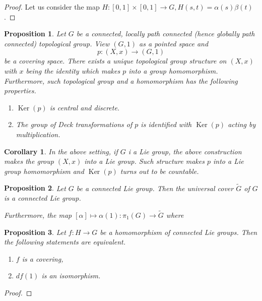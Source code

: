 \documentclass{article}
\newtheorem{proposition}{Proposition}[section]
\newtheorem{corollary}{Corollary}[section]
\numberwithin{equation}{section}
\DeclareMathOperator{\Ker}{Ker}
\begin{document}
\begin{proof}
Let us consider the map $H:[0,1]\times[0,1]\to G, H(s,t)=\alpha(s)\beta(t)$. 
\end{proof}

\begin{proposition}
Let $G$ be a connected, locally path connected (hence globally path connected) topological group. View $(G,1)$ as a pointed space and 
\begin{equation*}
p:(X,x)\to(G,1)
\end{equation*}
be a covering space. There exists a unique topological group structure on $(X,x)$ with $x$ being the identity which makes $p$ into a group homomorphism. Furthermore, such topological group and a homomorphism has the following properties.
\begin{enumerate}[1).]
\item $\Ker(p)$ is central and discrete.
\item The group of Deck transformations of $p$ is identified with $\Ker(p)$ acting by multiplication.
\end{enumerate}
\end{proposition}

\begin{corollary}
In the above setting, if $G$ i a Lie group, the above construction makes the group $(X,x)$ into a Lie group. Such structure makes $p$ into a Lie group homomorphism and $\Ker(p)$ turns out to be countable.
\end{corollary}

\begin{proposition}
Let $G$ be a connected Lie group. Then the universal cover $\tilde{G}$ of $G$ is a connected Lie group.\\
\par Furthermore, the map $[\alpha]\mapsto\alpha(1):\pi_1(G)\to\tilde{G}$ where
\end{proposition}

\begin{proposition}
Let $f:H\to G$ be a homomorphism of connected Lie groups. Then the following statements are equivalent.
\begin{enumerate}
\item $f$ is a covering,
\item $d f(1)$ is an isomorphism.
\end{enumerate}
\end{proposition}

\begin{proof}
\end{proof}
\end{document}

